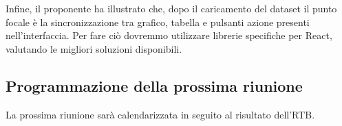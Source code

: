 Infine, il proponente ha illustrato che, dopo il caricamento del dataset il punto focale è la sincronizzazione tra grafico, tabella e pulsanti azione presenti nell'interfaccia. 
Per fare ciò dovremmo utilizzare librerie specifiche per React, valutando le migliori soluzioni disponibili.

\subsection{Programmazione della prossima riunione}
La prossima riunione sarà calendarizzata in seguito al risultato dell'RTB.

